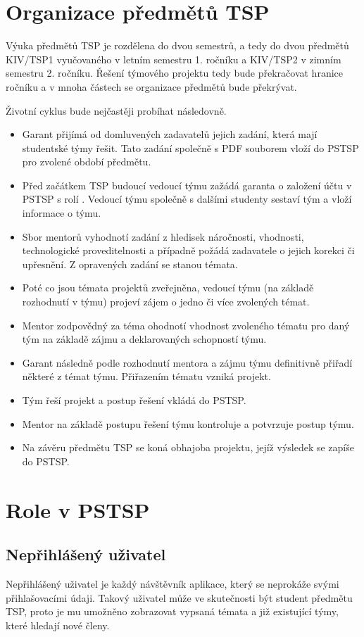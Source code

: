 \documentclass[czech,BP]{thesiskiv}
\begin{document}
\section{Organizace předmětů TSP}
	\par Výuka předmětů TSP je rozdělena do dvou semestrů, a tedy do dvou předmětů KIV/TSP1 vyučovaného v letním semestru 1. ročníku a KIV/TSP2 v zimním semestru 2. ročníku. Řešení týmového projektu tedy bude překračovat hranice ročníku a v mnoha částech se organizace předmětů bude překrývat.
	\par Životní cyklus bude nejčastěji probíhat následovně. 
	\begin{itemize}
		\item Garant přijímá od domluvených zadavatelů jejich zadání, která mají studentské týmy řešit. Tato zadání společně s PDF souborem vloží do PSTSP pro zvolené období předmětu.
		\item Před začátkem TSP budoucí vedoucí týmu zažádá garanta o založení účtu v PSTSP s rolí . Vedoucí týmu společně s dalšími studenty sestaví tým a vloží informace o týmu.
		\item Sbor mentorů vyhodnotí zadání z hledisek náročnosti, vhodnosti, technologické proveditelnosti a případně požádá zadavatele o jejich korekci či upřesnění. Z opravených zadání se stanou témata.
		\item Poté co jsou témata projektů zveřejněna, vedoucí týmu (na základě rozhodnutí v týmu) projeví zájem o jedno či více zvolených témat.
		\item Mentor zodpovědný za téma ohodnotí vhodnost zvoleného tématu pro daný tým na základě zájmu a deklarovaných schopností týmu.
		\item Garant následně podle rozhodnutí mentora a zájmu týmu definitivně přiřadí některé z témat týmu. Přiřazením tématu vzniká projekt.
		\item Tým řeší projekt a postup řešení vkládá do PSTSP.
		\item Mentor na základě postupu řešení týmu kontroluje a potvrzuje postup týmu.
		\item Na závěru předmětu TSP se koná obhajoba projektu, jejíž výsledek se zapíše do PSTSP.
	\end{itemize}
\section{Role v PSTSP}
	\subsection{Nepřihlášený uživatel}
		\par Nepřihlášený uživatel je každý návštěvník aplikace, který se neprokáže svými přihlašovacími údaji. Takový uživatel může ve skutečnosti být student předmětu TSP, proto je mu umožněno zobrazovat vypsaná témata a již existující týmy, které hledají nové členy.
\end{document}

